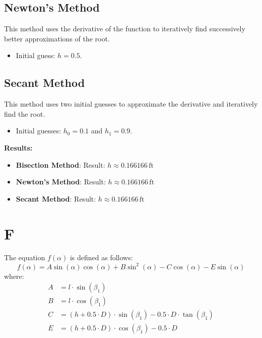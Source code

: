 \documentclass[a4paper]{article}
\begin{document}
\subsection{ Newton's Method}
This method uses the derivative of the function to iteratively find successively better approximations of the root.
\begin{itemize}
    \item Initial guess: \( h = 0.5 \).
\end{itemize}

\subsection{ Secant Method}
This method uses two initial guesses to approximate the derivative and iteratively find the root.
\begin{itemize}
    \item Initial guesses: \( h_0 = 0.1 \) and \( h_1 = 0.9 \).
\end{itemize}

\textbf{Results:}
\begin{itemize}
    \item \textbf{Bisection Method}: Result: \( h \approx 0.166166 \, \text{ft} \)
    \item \textbf{Newton's Method}: Result: \( h \approx 0.166166 \, \text{ft} \)
    \item \textbf{Secant Method}: Result: \( h \approx 0.166166 \, \text{ft} \)
\end{itemize}

\section{F}
The equation \( f(\alpha) \) is defined as follows:
\begin{equation}
    f(\alpha) = A \sin(\alpha) \cos(\alpha) + B \sin^2(\alpha) - C \cos(\alpha) - E \sin(\alpha)
\end{equation}
where:
\begin{align*}
    A &= l \cdot \sin(\beta_1) \\
    B &= l \cdot \cos(\beta_1) \\
    C &= (h + 0.5 \cdot D) \cdot \sin(\beta_1) - 0.5 \cdot D \cdot \tan(\beta_1) \\
    E &= (h + 0.5 \cdot D) \cdot \cos(\beta_1) - 0.5 \cdot D
\end{align*}
\end{document}
